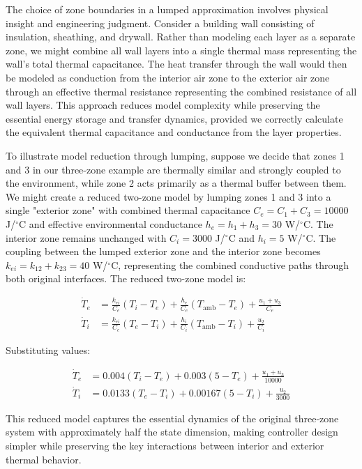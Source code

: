 The choice of zone boundaries in a lumped approximation involves physical insight and engineering judgment. Consider a building wall consisting of insulation, sheathing, and drywall. Rather than modeling each layer as a separate zone, we might combine all wall layers into a single thermal mass representing the wall's total thermal capacitance. The heat transfer through the wall would then be modeled as conduction from the interior air zone to the exterior air zone through an effective thermal resistance representing the combined resistance of all wall layers. This approach reduces model complexity while preserving the essential energy storage and transfer dynamics, provided we correctly calculate the equivalent thermal capacitance and conductance from the layer properties.

To illustrate model reduction through lumping, suppose we decide that zones 1 and 3 in our three-zone example are thermally similar and strongly coupled to the environment, while zone 2 acts primarily as a thermal buffer between them. We might create a reduced two-zone model by lumping zones 1 and 3 into a single "exterior zone" with combined thermal capacitance $C_e = C_1 + C_3 = 10000$ J/$\!^\circ$C and effective environmental conductance $h_e = h_1 + h_3 = 30$ W/$\!^\circ$C. The interior zone remains unchanged with $C_i = 3000$ J/$\!^\circ$C and $h_i = 5$ W/$\!^\circ$C. The coupling between the lumped exterior zone and the interior zone becomes $k_{ei} = k_{12} + k_{23} = 40$ W/$\!^\circ$C, representing the combined conductive paths through both original interfaces. The reduced two-zone model is:

\begin{align}
\dot{T}_e &= \frac{k_{ei}}{C_e}(T_i - T_e) + \frac{h_e}{C_e}(T_{\text{amb}} - T_e) + \frac{u_1 + u_3}{C_e} \\
\dot{T}_i &= \frac{k_{ei}}{C_e}(T_e - T_i) + \frac{h_i}{C_i}(T_{\text{amb}} - T_i) + \frac{u_2}{C_i}
\end{align}

Substituting values:

\begin{align}
\dot{T}_e &= 0.004(T_i - T_e) + 0.003(5 - T_e) + \frac{u_1 + u_3}{10000} \\
\dot{T}_i &= 0.0133(T_e - T_i) + 0.00167(5 - T_i) + \frac{u_2}{3000}
\end{align}

This reduced model captures the essential dynamics of the original three-zone system with approximately half the state dimension, making controller design simpler while preserving the key interactions between interior and exterior thermal behavior.

